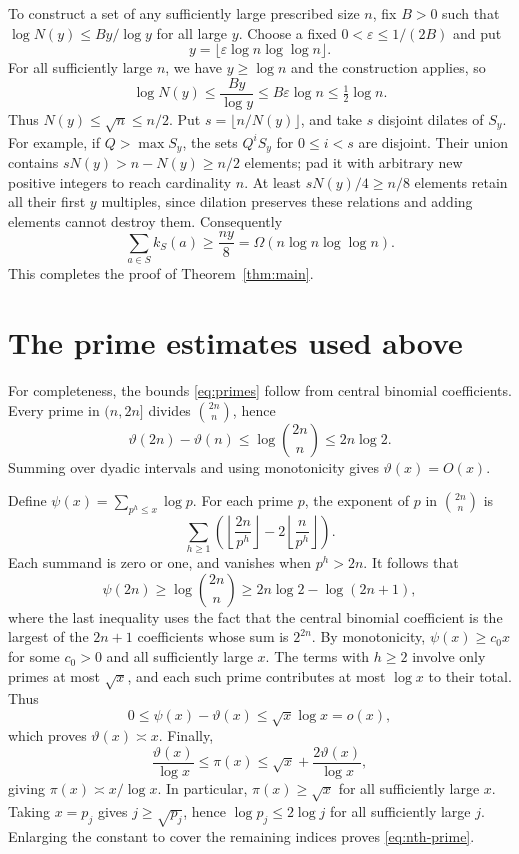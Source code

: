 \documentclass[11pt,a4paper]{article}
\begin{document}
\newpage
To construct a set of any sufficiently large prescribed size $n$, fix $B>0$ such that $\log N(y)\le By/\log y$ for all large $y$.
Choose a fixed $0<\varepsilon\le1/(2B)$ and put
\[
y=\lfloor\varepsilon\log n\log\log n\rfloor.
\]
For all sufficiently large $n$, we have $y\ge\log n$ and the construction applies, so
\[
\log N(y)\le\frac{By}{\log y}
\le B\varepsilon\log n\le\tfrac12\log n.
\]
Thus $N(y)\le\sqrt n\le n/2$.
Put $s=\lfloor n/N(y)\rfloor$, and take $s$ disjoint dilates of $S_y$.
For example, if $Q>\max S_y$, the sets $Q^iS_y$ for $0\le i<s$ are disjoint.
Their union contains $sN(y)>n-N(y)\ge n/2$ elements; pad it with arbitrary new positive integers to reach cardinality $n$.
At least $sN(y)/4\ge n/8$ elements retain all their first $y$ multiples, since dilation preserves these relations and adding elements cannot destroy them.
Consequently
\[
\sum_{a\in S}k_S(a)\ge\frac{ny}{8}
=\Omega(n\log n\log\log n).
\]
This completes the proof of Theorem~\ref{thm:main}.

\appendix
\section{The prime estimates used above}

For completeness, the bounds \eqref{eq:primes} follow from central binomial coefficients.
Every prime in $(n,2n]$ divides $\binom{2n}{n}$, hence
\[
\vartheta(2n)-\vartheta(n)\le\log\binom{2n}{n}\le2n\log2.
\]
Summing over dyadic intervals and using monotonicity gives $\vartheta(x)=O(x)$.

Define $\psi(x)=\sum_{p^h\le x}\log p$.
For each prime $p$, the exponent of $p$ in $\binom{2n}{n}$ is
\[
\sum_{h\ge1}\left(\left\lfloor\frac{2n}{p^h}\right\rfloor
-2\left\lfloor\frac{n}{p^h}\right\rfloor\right).
\]
Each summand is zero or one, and vanishes when $p^h>2n$.
It follows that
\[
\psi(2n)\ge\log\binom{2n}{n}\ge2n\log2-\log(2n+1),
\]
where the last inequality uses the fact that the central binomial coefficient is the largest of the $2n+1$ coefficients whose sum is $2^{2n}$.
By monotonicity, $\psi(x)\ge c_0x$ for some $c_0>0$ and all sufficiently large $x$.
The terms with $h\ge2$ involve only primes at most $\sqrt x$, and each such prime contributes at most $\log x$ to their total.
Thus
\[
0\le\psi(x)-\vartheta(x)\le\sqrt x\log x=o(x),
\]
which proves $\vartheta(x)\asymp x$.
Finally,
\[
\frac{\vartheta(x)}{\log x}\le\pi(x)
\le\sqrt x+\frac{2\vartheta(x)}{\log x},
\]
giving $\pi(x)\asymp x/\log x$.
In particular, $\pi(x)\ge\sqrt x$ for all sufficiently large $x$.
Taking $x=p_j$ gives $j\ge\sqrt{p_j}$, hence $\log p_j\le2\log j$ for all sufficiently large $j$.
Enlarging the constant to cover the remaining indices proves \eqref{eq:nth-prime}.
\end{document}
